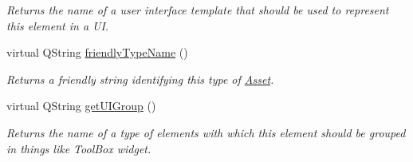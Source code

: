 \begin{DoxyCompactItemize}
\begin{DoxyCompactList}\small\item\em Returns the name of a user interface template that should be used to represent this element in a U\-I. \end{DoxyCompactList}\item 
virtual Q\-String \hyperlink{class_picto_1_1_control_element_ad9a828f49943e34a15a69138c64ac4da}{friendly\-Type\-Name} ()
\begin{DoxyCompactList}\small\item\em Returns a friendly string identifying this type of \hyperlink{class_picto_1_1_asset}{Asset}. \end{DoxyCompactList}\item 
\hypertarget{class_picto_1_1_control_element_a4882c645365d985cb0f8a46061be984e}{virtual Q\-String \hyperlink{class_picto_1_1_control_element_a4882c645365d985cb0f8a46061be984e}{get\-U\-I\-Group} ()}\label{class_picto_1_1_control_element_a4882c645365d985cb0f8a46061be984e}

\begin{DoxyCompactList}\small\item\em Returns the name of a type of elements with which this element should be grouped in things like Tool\-Box widget. \end{DoxyCompactList}\end{DoxyCompactItemize}
